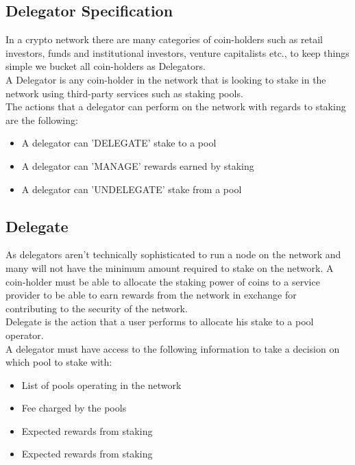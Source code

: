  
 
 

\subsection{Delegator Specification}

 In a crypto network there are many categories of coin-holders such as retail investors, funds and institutional investors, venture capitalists etc., to keep things simple we bucket all coin-holders as Delegators.\\
 
 A Delegator is any coin-holder in the network that is looking to stake in the network using third-party services such as staking pools.\\
 
 The actions that a delegator can perform on the network with regards to staking are the following:
   \begin{itemize}
       \item A delegator can 'DELEGATE' stake to a pool 
       \item A delegator can 'MANAGE' rewards earned by staking
       \item A delegator can 'UNDELEGATE' stake from a pool
   \end{itemize}
    
    
\subsection{Delegate}
 As delegators aren't technically sophisticated to run a node on the network and many will not have the minimum amount required to stake on the network. A coin-holder must be able to allocate the staking power of coins to a service provider to be able to earn rewards from the network in exchange for contributing to the security of the network.\\
 
Delegate is the action that a user performs to allocate his stake to a pool operator.\\
   
A delegator must have access to the following information to take a decision on which pool to stake with:
     \begin{itemize}
      \item List of pools operating in the network 
      \item Fee charged by the pools
      \item Expected rewards from staking 
      \item Expected rewards from staking 
  \end{itemize}
    
